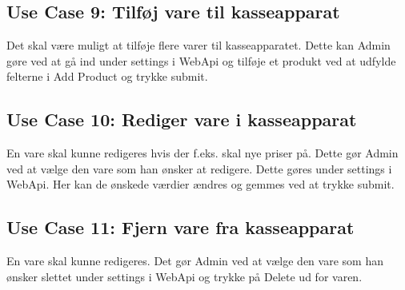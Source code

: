 \subsection*{Use Case 9: Tilføj vare til kasseapparat}
Det skal være muligt at tilføje flere varer til kasseapparatet. Dette kan Admin gøre ved at gå ind under settings i WebApi og tilføje et produkt ved at udfylde felterne i Add Product og trykke submit. 

\subsection*{Use Case 10: Rediger vare i kasseapparat}
En vare skal kunne redigeres hvis der f.eks. skal nye priser på. Dette gør Admin ved at vælge den vare som han ønsker at redigere. Dette gøres under settings i WebApi. Her kan de ønskede værdier ændres og gemmes ved at trykke submit.

\subsection*{Use Case 11: Fjern vare fra kasseapparat}
En vare skal kunne redigeres. Det gør Admin ved at vælge den vare som han ønsker slettet under settings i WebApi og trykke på Delete ud for varen.
